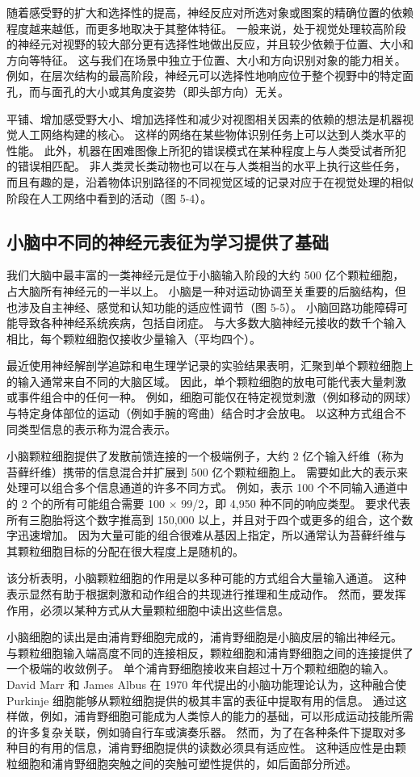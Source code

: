 随着感受野的扩大和选择性的提高，神经反应对所选对象或图案的精确位置的依赖程度越来越低，而更多地取决于其整体特征。 一般来说，处于视觉处理较高阶段的神经元对视野的较大部分更有选择性地做出反应，并且较少依赖于位置、大小和方向等特征。 这与我们在场景中独立于位置、大小和方向识别对象的能力相关。 例如，在层次结构的最高阶段，神经元可以选择性地响应位于整个视野中的特定面孔，而与面孔的大小或其角度姿势（即头部方向）无关。

平铺、增加感受野大小、增加选择性和减少对视图相关因素的依赖的想法是机器视觉人工网络构建的核心。 这样的网络在某些物体识别任务上可以达到人类水平的性能。 此外，机器在困难图像上所犯的错误模式在某种程度上与人类受试者所犯的错误相匹配。 非人类灵长类动物也可以在与人类相当的水平上执行这些任务，而且有趣的是，沿着物体识别路径的不同视觉区域的记录对应于在视觉处理的相似阶段在人工网络中看到的活动（图 5-4）。

\subsection{小脑中不同的神经元表征为学习提供了基础}
我们大脑中最丰富的一类神经元是位于小脑输入阶段的大约 500 亿个颗粒细胞，占大脑所有神经元的一半以上。 小脑是一种对运动协调至关重要的后脑结构，但也涉及自主神经、感觉和认知功能的适应性调节（图 5-5）。 小脑回路功能障碍可能导致各种神经系统疾病，包括自闭症。 与大多数大脑神经元接收的数千个输入相比，每个颗粒细胞仅接收少量输入（平均四个）。

最近使用神经解剖学追踪和电生理学记录的实验结果表明，汇聚到单个颗粒细胞上的输入通常来自不同的大脑区域。 因此，单个颗粒细胞的放电可能代表大量刺激或事件组合中的任何一种。 例如，细胞可能仅在特定视觉刺激（例如移动的网球）与特定身体部位的运动（例如手腕的弯曲）结合时才会放电。 以这种方式组合不同类型信息的表示称为混合表示。

小脑颗粒细胞提供了发散前馈连接的一个极端例子，大约 2 亿个输入纤维（称为苔藓纤维）携带的信息混合并扩展到 500 亿个颗粒细胞上。 需要如此大的表示来处理可以组合多个信息通道的许多不同方式。 例如，表示 100 个不同输入通道中的 2 个的所有可能组合需要 100 × 99/2，即 4,950 种不同的响应类型。 要求代表所有三胞胎将这个数字推高到 150,000 以上，并且对于四个或更多的组合，这个数字迅速增加。 因为大量可能的组合很难从基因上指定，所以通常认为苔藓纤维与其颗粒细胞目标的分配在很大程度上是随机的。

该分析表明，小脑颗粒细胞的作用是以多种可能的方式组合大量输入通道。 这种表示显然有助于根据刺激和动作组合的共现进行推理和生成动作。 然而，要发挥作用，必须以某种方式从大量颗粒细胞中读出这些信息。

小脑细胞的读出是由浦肯野细胞完成的，浦肯野细胞是小脑皮层的输出神经元。 与颗粒细胞输入端高度不同的连接相反，颗粒细胞和浦肯野细胞之间的连接提供了一个极端的收敛例子。 单个浦肯野细胞接收来自超过十万个颗粒细胞的输入。 David Marr 和 James Albus 在 1970 年代提出的小脑功能理论认为，这种融合使 Purkinje 细胞能够从颗粒细胞提供的极其丰富的表征中提取有用的信息。 通过这样做，例如，浦肯野细胞可能成为人类惊人的能力的基础，可以形成运动技能所需的许多复杂关联，例如骑自行车或演奏乐器。 然而，为了在各种条件下提取对多种目的有用的信息，浦肯野细胞提供的读数必须具有适应性。 这种适应性是由颗粒细胞和浦肯野细胞突触之间的突触可塑性提供的，如后面部分所述。

